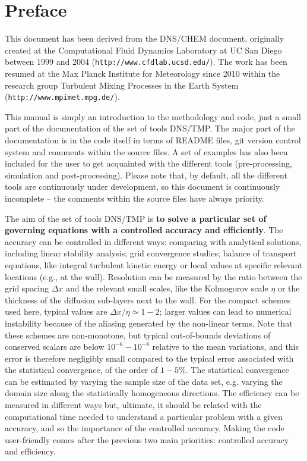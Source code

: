 \chapter*{Preface}
\sloppy

This document has been derived from the DNS/CHEM document, originally created at
the Computational Fluid Dynamics Laboratory at UC San Diego between 1999 and
2004 ({\tt http://www.cfdlab.ucsd.edu/}). The work has been resumed at the Max
Planck Institute for Meteorology since 2010 within the research group Turbulent
Mixing Processes in the Earth System ({\tt http://www.mpimet.mpg.de/}).

This manual is simply an introduction to the methodology and code, just a small
part of the documentation of the set of tools DNS/TMP. The major part of the
documentation is in the code itself in terms of README files, git version
control system and comments within the source files. A set of examples has also
been included for the user to get acquainted with the different tools
(pre-processing, simulation and post-processing). Please note that, by default,
all the different tools are continuously under development, so this document is
continuously incomplete -- the comments within the source files have always
priority.

The aim of the set of tools DNS/TMP is {\bf to solve a particular set of
  governing equations with a controlled accuracy and efficiently}. The accuracy
can be controlled in different ways: comparing with analytical solutions,
including linear stability analysis; grid convergence studies; balance of
transport equations, like integral turbulent kinetic energy or local values at
specific relevant locations (e.g., at the wall). Resolution can be measured by
the ratio between the grid spacing $\Delta x$ and the relevant small scales,
like the Kolmogorov scale $\eta$ or the thickness of the diffusion sub-layers
next to the wall. For the compact schemes used here, typical values are $\Delta
x/\eta\simeq 1-2$; larger values can lead to numerical instability because of
the aliasing generated by the non-linear terms. Note that these schemes are
non-monotone, but typical out-of-bounds deviations of conserved scalars are
below $10^{-6}-10^{-8}$ relative to the mean variations, and this error is
therefore negligibly small compared to the typical error associated with the
statistical convergence, of the order of $1-5$\%. The statistical convergence
can be estimated by varying the sample size of the data set, e.g. varying the
domain size along the statistically homogeneous directions. The efficiency can
be measured in different ways but, ultimate, it should be related with the
computational time needed to understand a particular problem with a given
accuracy, and so the importance of the controlled accuracy. Making the code
user-friendly comes after the previous two main priorities: controlled accuracy
and efficiency.


